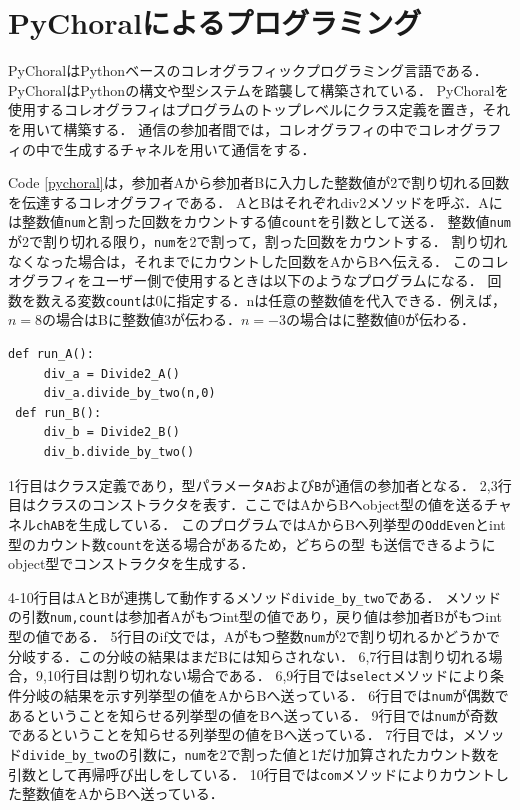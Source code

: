 \documentclass{thesis}
\begin{document}
\chapter{PyChoralによるプログラミング}
PyChoralはPythonベースのコレオグラフィックプログラミング言語である．
PyChoralはPythonの構文や型システムを踏襲して構築されている．
PyChoralを使用するコレオグラフィはプログラムのトップレベルにクラス定義を置き，それを用いて構築する．
通信の参加者間では，コレオグラフィの中でコレオグラフィの中で生成するチャネルを用いて通信をする．

Code \ref{pychoral}は，参加者Aから参加者Bに入力した整数値が2で割り切れる回数を伝達するコレオグラフィである．
AとBはそれぞれ\textsf{div2}メソッドを呼ぶ．Aには整数値\texttt{num}と割った回数をカウントする値\texttt{count}を引数として送る．
整数値\texttt{num}が2で割り切れる限り，\texttt{num}を2で割って，割った回数をカウントする．
割り切れなくなった場合は，それまでにカウントした回数をAからBへ伝える．
このコレオグラフィをユーザー側で使用するときは以下のようなプログラムになる．
回数を数える変数\texttt{count}は0に指定する．nは任意の整数値を代入できる．例えば，$n=8$の場合はBに整数値3が伝わる．$n=-3$の場合はに整数値0が伝わる．

\begin{lstlisting}[numbers=none]
 def run_A():
     div_a = Divide2_A()
     div_a.divide_by_two(n,0)
 def run_B():
     div_b = Divide2_B()
     div_b.divide_by_two()
\end{lstlisting}
1行目はクラス定義であり，型パラメータ\texttt{A}および\texttt{B}が通信の参加者となる．
2,3行目はクラスのコンストラクタを表す．ここではAからBへobject型の値を送るチャネル\texttt{chAB}を生成している．
このプログラムではAからBへ列挙型の\texttt{OddEven}とint型のカウント数\texttt{count}を送る場合があるため，どちらの型
も送信できるようにobject型でコンストラクタを生成する．

4-10行目はAとBが連携して動作するメソッド\texttt{divide\_by\_two}である．
メソッドの引数\texttt{num,count}は参加者Aがもつint型の値であり，戻り値は参加者Bがもつint型の値である．
5行目のif文では，Aがもつ整数\texttt{num}が2で割り切れるかどうかで分岐する．この分岐の結果はまだBには知らされない．
6,7行目は割り切れる場合，9,10行目は割り切れない場合である．
6,9行目では\texttt{select}メソッドにより条件分岐の結果を示す列挙型の値をAからBへ送っている．
6行目では\texttt{num}が偶数であるということを知らせる列挙型の値{}をBへ送っている．
9行目では\texttt{num}が奇数であるということを知らせる列挙型の値{}をBへ送っている．
7行目では，メソッド\texttt{divide\_by\_two}の引数に，\texttt{num}を2で割った値と1だけ加算されたカウント数を引数として再帰呼び出しをしている．
10行目では\texttt{com}メソッドによりカウントした整数値をAからBへ送っている．
\end{document}
